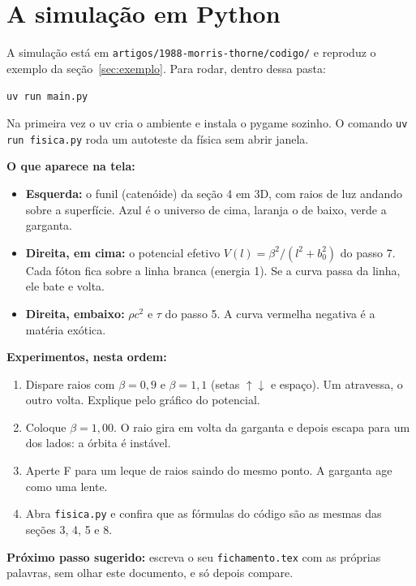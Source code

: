 \documentclass[11pt,a4paper]{article}
\begin{document}
\section{A simulação em Python}

A simulação está em \texttt{artigos/1988-morris-thorne/codigo/} e reproduz o exemplo da seção~\ref{sec:exemplo}. Para
rodar, dentro dessa pasta:
\begin{center}
\texttt{uv run main.py}
\end{center}
Na primeira vez o uv cria o ambiente e instala o pygame sozinho. O comando \texttt{uv run fisica.py} roda um autoteste
da física sem abrir janela.

\textbf{O que aparece na tela:}
\begin{itemize}[nosep]
\item \textbf{Esquerda:} o funil (catenóide) da seção 4 em 3D, com raios de luz andando sobre a superfície. Azul é o
universo de cima, laranja o de baixo, verde a garganta.
\item \textbf{Direita, em cima:} o potencial efetivo $V(l) = \beta^2/(l^2 + b_0^2)$ do passo 7. Cada fóton fica sobre
a linha branca (energia 1). Se a curva passa da linha, ele bate e volta.
\item \textbf{Direita, embaixo:} $\rho c^2$ e $\tau$ do passo 5. A curva vermelha negativa é a matéria exótica.
\end{itemize}

\textbf{Experimentos, nesta ordem:}
\begin{enumerate}[nosep]
\item Dispare raios com $\beta = 0{,}9$ e $\beta = 1{,}1$ (setas $\uparrow\downarrow$ e espaço). Um atravessa, o outro
volta. Explique pelo gráfico do potencial.
\item Coloque $\beta = 1{,}00$. O raio gira em volta da garganta e depois escapa para um dos lados: a órbita é instável.
\item Aperte F para um leque de raios saindo do mesmo ponto. A garganta age como uma lente.
\item Abra \texttt{fisica.py} e confira que as fórmulas do código são as mesmas das seções 3, 4, 5 e 8.
\end{enumerate}

\textbf{Próximo passo sugerido:} escreva o seu \texttt{fichamento.tex} com as próprias palavras, sem olhar este
documento, e só depois compare.
\end{document}
